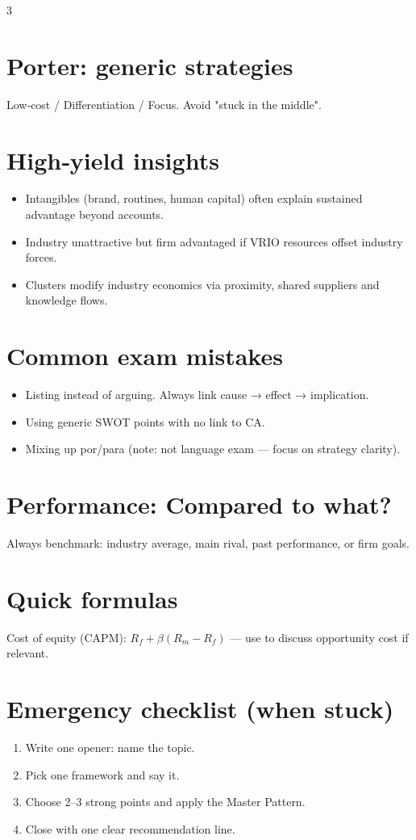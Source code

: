 \documentclass[9pt,landscape,a4paper]{article}
\begin{document}
\begin{multicols}{3}
\section*{Porter: generic strategies}
Low‑cost / Differentiation / Focus. Avoid "stuck in the middle".

\columnbreak

\section*{High‑yield insights}
\begin{itemize}
  \item Intangibles (brand, routines, human capital) often explain sustained advantage beyond accounts.
  \item Industry unattractive but firm advantaged if VRIO resources offset industry forces.
  \item Clusters modify industry economics via proximity, shared suppliers and knowledge flows.
\end{itemize}

\section*{Common exam mistakes}
\begin{itemize}
  \item Listing instead of arguing. Always link cause → effect → implication.
  \item Using generic SWOT points with no link to CA.
  \item Mixing up por/para (note: not language exam — focus on strategy clarity).
\end{itemize}

\section*{Performance: Compared to what?}
Always benchmark: industry average, main rival, past performance, or firm goals.

\section*{Quick formulas}
Cost of equity (CAPM): $R_f + \beta( R_m - R_f)$ — use to discuss opportunity cost if relevant.

\columnbreak

\section*{Emergency checklist (when stuck)}
\begin{enumerate}
  \item Write one opener: name the topic.
  \item Pick one framework and say it.
  \item Choose 2–3 strong points and apply the Master Pattern.
  \item Close with one clear recommendation line.
\end{enumerate}


\end{multicols}
\end{document}
